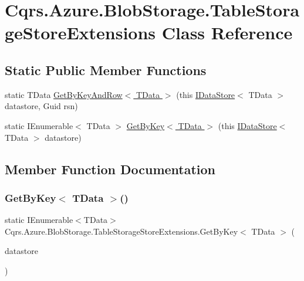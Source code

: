 \hypertarget{classCqrs_1_1Azure_1_1BlobStorage_1_1TableStorageStoreExtensions}{}\section{Cqrs.\+Azure.\+Blob\+Storage.\+Table\+Storage\+Store\+Extensions Class Reference}
\label{classCqrs_1_1Azure_1_1BlobStorage_1_1TableStorageStoreExtensions}
\subsection*{Static Public Member Functions}
\begin{DoxyCompactItemize}
\item 
static T\+Data \hyperlink{classCqrs_1_1Azure_1_1BlobStorage_1_1TableStorageStoreExtensions_a31a5a94e2caf554d17cde68d274a57c2}{Get\+By\+Key\+And\+Row$<$ T\+Data $>$} (this \hyperlink{interfaceCqrs_1_1DataStores_1_1IDataStore}{I\+Data\+Store}$<$ T\+Data $>$ datastore, Guid rsn)
\item 
static I\+Enumerable$<$ T\+Data $>$ \hyperlink{classCqrs_1_1Azure_1_1BlobStorage_1_1TableStorageStoreExtensions_a773bb93cb6a1f7a5d8d0ff2bf245c655}{Get\+By\+Key$<$ T\+Data $>$} (this \hyperlink{interfaceCqrs_1_1DataStores_1_1IDataStore}{I\+Data\+Store}$<$ T\+Data $>$ datastore)
\end{DoxyCompactItemize}


\subsection{Member Function Documentation}
\mbox{\label{classCqrs_1_1Azure_1_1BlobStorage_1_1TableStorageStoreExtensions_a773bb93cb6a1f7a5d8d0ff2bf245c655}} 
\subsubsection{\texorpdfstring{Get\+By\+Key$<$ T\+Data $>$()}{GetByKey< TData >()}}
{\footnotesize\ttfamily static I\+Enumerable$<$T\+Data$>$ Cqrs.\+Azure.\+Blob\+Storage.\+Table\+Storage\+Store\+Extensions.\+Get\+By\+Key$<$ T\+Data $>$ (\begin{DoxyParamCaption}\item[{this \hyperlink{interfaceCqrs_1_1DataStores_1_1IDataStore}{I\+Data\+Store}$<$ T\+Data $>$}]{datastore }\end{DoxyParamCaption})\hspace{0.3cm}{\ttfamily [static]}}


